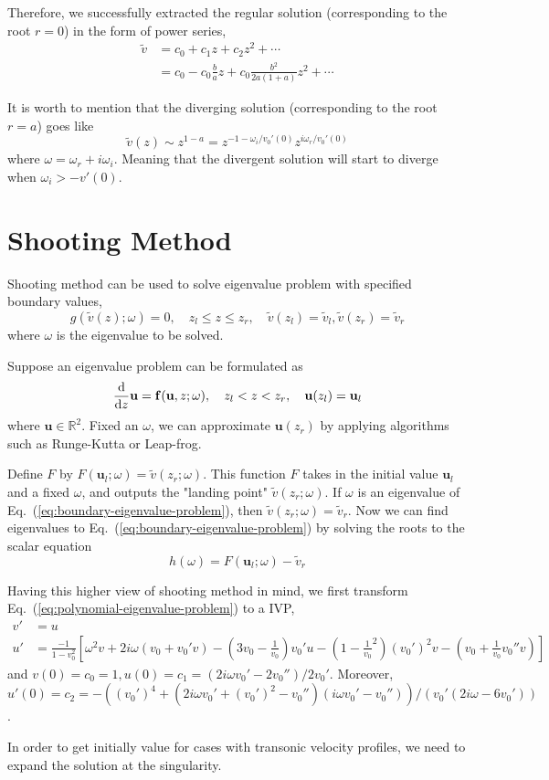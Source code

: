 Therefore, we successfully extracted the regular solution (corresponding to the root $r=0$) in the form of power series,
\begin{equation} \label{eq:regular-solution}
	\begin{aligned}
		\tilde{v} & = c_0 + c_1z + c_2z^2 + \cdots                               \\
		          & = c_0 - c_0\frac{b}{a}z + c_0\frac{b^2}{2a(1+a)}z^2 + \cdots
	\end{aligned}
\end{equation}

It is worth to mention that the diverging solution (corresponding to the root $r=a$) goes like
\[ \tilde{v}(z) \sim z^{1-a} = z^{-1-\omega_i/v_0'(0)}z^{i\omega_r/v_0'(0)}  \]
where $\omega = \omega_r + i\omega_i$. Meaning that the divergent solution will start to diverge when $\omega_i > -v'(0)$.

\section{Shooting Method}
Shooting method can be used to solve eigenvalue problem with specified boundary values,
\begin{equation} \label{eq:boundary-eigenvalue-problem}
	g(\tilde{v}(z);\omega) = 0,
	\quad
	z_l \leq z \leq z_r,
	\quad
	\tilde{v}(z_l) = \tilde{v}_l, \tilde{v}(z_r) = \tilde{v}_r
\end{equation}
where $\omega$ is the eigenvalue to be solved.

Suppose an eigenvalue problem can be formulated as
\[ \dv{z}\mathbf{u} = \mathbf{f}(\mathbf{u},z;\omega),
	\quad
	z_l<z<z_r,
	\quad
	\mathbf{u}(z_l) = \mathbf{u}_l
\]
where $\mathbf{u}\in\mathbb{R}^2$. Fixed an $\omega$, we can approximate $\mathbf{u}(z_r)$ by applying algorithms such as Runge-Kutta or Leap-frog.

Define $F$ by $F(\mathbf{u}_l;\omega)=\tilde{v}(z_r;\omega)$. This function $F$ takes in the initial value $\mathbf{u}_l$ and a fixed $\omega$, and outputs the "landing point" $\tilde{v}(z_r;\omega)$. If $\omega$ is an eigenvalue of Eq.~(\ref{eq:boundary-eigenvalue-problem}), then $\tilde{v}(z_r;\omega) = \tilde{v}_r$. Now we can find eigenvalues to Eq.~(\ref{eq:boundary-eigenvalue-problem}) by solving the roots to the scalar equation
\[h(\omega) = F(\mathbf{u}_l;\omega) - \tilde{v}_r\]

Having this higher view of shooting method in mind, we first transform Eq.~(\ref{eq:polynomial-eigenvalue-problem}) to a IVP,
\begin{align*}
	v' & = u                        \\
	u' & = \frac{-1}{1-v_0^2}\left[
		\omega^2v + 2i\omega(v_0+v_0'v) - \left(3v_0 - \frac{1}{v_0}\right)v_0'u - \left(1-\frac{1}{v_0}^2\right)(v_0')^2v - \left(v_0+\frac{1}{v_0}v_0'' v\right)
		\right]
\end{align*}
and $v(0)=c_0=1,u(0)=c_1=(2i\omega v_0'-2v_0'')/2v_0'$. Moreover, $u'(0)=c_2=-((v_0')^4+(2i\omega v_0' + (v_0')^2 - v_0'')(i\omega v_0' - v_0''))/(v_0'(2i\omega-6v_0'))$.

In order to get initially value for cases with transonic velocity profiles, we need to expand the solution at the singularity.

